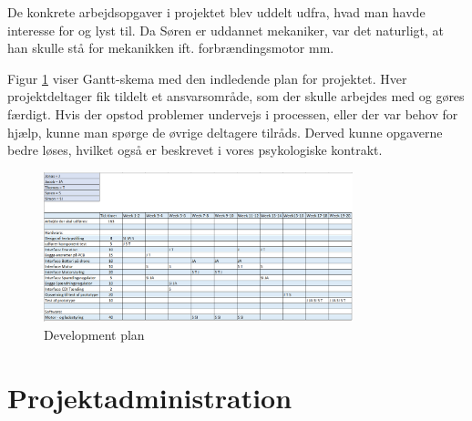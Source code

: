 De konkrete arbejdsopgaver i projektet blev uddelt udfra, hvad man havde interesse for og lyst til. Da Søren er uddannet mekaniker, var det naturligt, at han skulle stå for mekanikken ift. forbrændingsmotor mm.



Figur \ref{fig:p1} viser Gantt-skema med den indledende plan for projektet. Hver projektdeltager fik tildelt et ansvarsområde, som der skulle arbejdes med og gøres færdigt. Hvis der opstod problemer undervejs i processen, eller der var behov for hjælp, kunne man spørge de øvrige deltagere tilråds. Derved kunne opgaverne bedre løses, hvilket også er beskrevet i vores psykologiske kontrakt.


\begin{figure}[h]
  \centering
  \includegraphics[width=0.8\textwidth]{./figurer/p1.png}
  \caption{Development plan}
  \label{fig:p1}
\end{figure}


\section{Projektadministration}
\label{sec:proj-}

